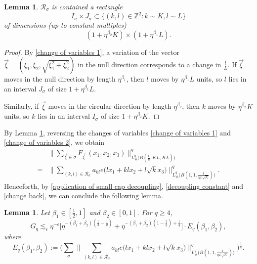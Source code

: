\documentclass[11pt]{amsart}
\numberwithin{equation}{section}
\newtheorem{lemma}[theorem]{Lemma}
\theoremstyle{definition}
\theoremstyle{proposition}
\begin{document}
\begin{lemma}  \label{R-sigma}
 ${\mathcal R}_\sigma$ is contained a rectangle 
\[
I_\sigma \times J_\sigma \subset \{(k,l)\in \mathbb Z^2: k\sim K,l\sim L\}
\]
of dimensions (up to constant multiples)
\[
(1+\eta^{\beta_2}K) \times (1+\eta^{\beta_1}L).
\]
\end{lemma}
\begin{proof} By \eqref{change of variables 1}, a variation of the vector $\Vec{\xi}=(\xi_1,\xi_2,\sqrt{\xi_1^2+\xi_2^2})$ in the null direction corresponds to a change in $\frac{l}{L}$. If $\Vec{\xi}$ moves in the null direction by length $\eta^{\beta_1}$, then $l$ moves by $\eta^{\beta_1}L$ units, so $l$ lies in an interval $J_\sigma$ of size $1+\eta^{\beta_1}L$. 

Similarly,  if $\Vec{\xi}$ moves in the circular direction by length $\eta^{\beta_2}$, then $k$ moves by $\eta^{\beta_2}K$ units, so $k$ lies in an interval $I_\sigma$ of size $1+\eta^{\beta_2}K$.   \end{proof}

By Lemma \ref{R-sigma}, reversing the changes of variables \eqref{change of variables 1} and \eqref{change of variables 2}, we obtain 
\begin{equation}   \label{change back}
\begin{split}
&\Big \|\sum_{\Vec{\xi}\in \sigma}F_{\Vec{\xi}}\,(x_1,x_2,x_3) \Big\|^q_{L^q_{\#}\Big(B(\frac{1}{\eta},KL,KL)\Big)}    
\\ =&\Big\|\sum_{(k,l)\in {\mathcal R}_\sigma} a_{kl}e\Big(lx_1+klx_2+l\sqrt{k}x_3\Big)\Big\|^q_{L^q_{\#}\Big(B(1,1,\frac{1}{\eta L\sqrt{K}})\Big)}.   
\end{split}    
\end{equation}
Henceforth, by \eqref{application of small cap decoupling}, \eqref{decoupling constant} and \eqref{change back}, we can conclude the following lemma. 
\begin{lemma}   \label{after small cap decoupling}
Let $\beta_1\in [\frac{1}{2},1]$ and $\beta_2\in[0,1]$. For $q\ge 4$,
\begin{equation}  \label{variance 3}
G_q\lesssim_\epsilon  \eta^{-\epsilon} \Big[\eta^{-(\beta_1+\beta_2)(\frac{1}{2}-\frac{1}{q})}+\eta^{-(\beta_1+\beta_2)(1-\frac{2}{q})+\frac{1}{q}}\Big] \cdot E_q(\beta_1,\beta_2),
\end{equation}  
where 
\begin{equation}  \label{definition of Eq}
E_q(\beta_1,\beta_2):=\Big(\sum_{\sigma}\Big\|\sum_{(k,l)\in \mathcal R_\sigma} a_{kl}e\Big(lx_1+klx_2+l\sqrt{k}x_3\Big)\Big\|^q_{L^q_{\#}\Big(B(1,1,\frac{1}{\eta L\sqrt{K}})\Big)}\Big)^{\frac{1}{q}}.    
\end{equation}
\end{lemma}
\end{document}
